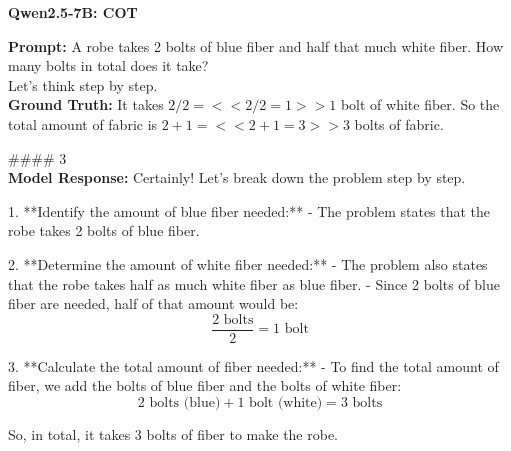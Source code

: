 \begin{figure*}
\begin{AIbox}{\bf{\large Qwen2.5-7B: COT}}
\vspace{0.5cm}

\textbf{Prompt:} A robe takes 2 bolts of blue fiber and half that much white fiber.  How many bolts in total does it take?
\\

Let's think step by step. 
\\

\textbf{Ground Truth:} It takes $2/2=<<2/2=1>>1$ bolt of white fiber. So the total amount of fabric is $2+1=<<2+1=3>>3$ bolts of fabric.

\#\#\#\# 3 
\\

\textbf{Model Response:} Certainly! Let's break down the problem step by step.

1. **Identify the amount of blue fiber needed:**
   - The problem states that the robe takes 2 bolts of blue fiber.

2. **Determine the amount of white fiber needed:**
   - The problem also states that the robe takes half as much white fiber as blue fiber.
   - Since 2 bolts of blue fiber are needed, half of that amount would be:
     \[
     \frac{2 \text{ bolts}}{2} = 1 \text{ bolt}
     \]

3. **Calculate the total amount of fiber needed:**
   - To find the total amount of fiber, we add the bolts of blue fiber and the bolts of white fiber:
     \[
     2 \text{ bolts (blue)} + 1 \text{ bolt (white)} = 3 \text{ bolts}
     \]

So, in total, it takes 3 bolts of fiber to make the robe.

\end{AIbox}
\caption{Example of Chain-of-thought Prompt with Qwen2.5-7B-Instruct.}
\end{figure*}
